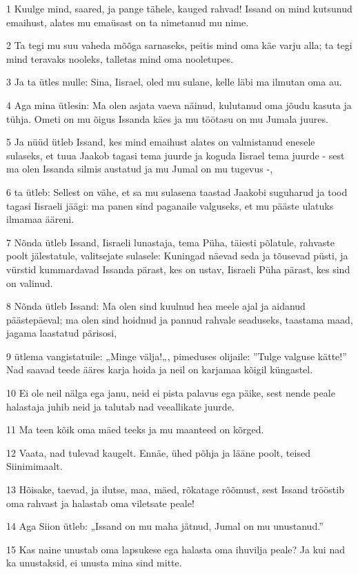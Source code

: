 \par 1 Kuulge mind, saared, ja pange tähele, kauged rahvad! Issand on mind kutsunud emaihust, alates mu emaüsast on ta nimetanud mu nime.
\par 2 Ta tegi mu suu vaheda mõõga sarnaseks, peitis mind oma käe varju alla; ta tegi mind teravaks nooleks, talletas mind oma nooletupes.
\par 3 Ja ta ütles mulle: Sina, Iisrael, oled mu sulane, kelle läbi ma ilmutan oma au.
\par 4 Aga mina ütlesin: Ma olen asjata vaeva näinud, kulutanud oma jõudu kasuta ja tühja. Ometi on mu õigus Issanda käes ja mu töötasu on mu Jumala juures.
\par 5 Ja nüüd ütleb Issand, kes mind emaihust alates on valmistanud enesele sulaseks, et tuua Jaakob tagasi tema juurde ja koguda Iisrael tema juurde - sest ma olen Issanda silmis austatud ja mu Jumal on mu tugevus -,
\par 6 ta ütleb: Sellest on vähe, et sa mu sulasena taastad Jaakobi suguharud ja tood tagasi Iisraeli jäägi: ma panen sind paganaile valguseks, et mu pääste ulatuks ilmamaa ääreni.
\par 7 Nõnda ütleb Issand, Iisraeli lunastaja, tema Püha, täiesti põlatule, rahvaste poolt jälestatule, valitsejate sulasele: Kuningad näevad seda ja tõusevad püsti, ja vürstid kummardavad Issanda pärast, kes on ustav, Iisraeli Püha pärast, kes sind on valinud.
\par 8 Nõnda ütleb Issand: Ma olen sind kuulnud hea meele ajal ja aidanud päästepäeval; ma olen sind hoidnud ja pannud rahvale seaduseks, taastama maad, jagama laastatud pärisosi,
\par 9 ütlema vangistatuile: „Minge välja!„, pimeduses olijaile: ”Tulge valguse kätte!” Nad saavad teede ääres karja hoida ja neil on karjamaa kõigil küngastel.
\par 10 Ei ole neil nälga ega janu, neid ei pista palavus ega päike, sest nende peale halastaja juhib neid ja talutab nad veeallikate juurde.
\par 11 Ma teen kõik oma mäed teeks ja mu maanteed on kõrged.
\par 12 Vaata, nad tulevad kaugelt. Ennäe, ühed põhja ja lääne poolt, teised Siinimimaalt.
\par 13 Hõisake, taevad, ja ilutse, maa, mäed, rõkatage rõõmust, sest Issand trööstib oma rahvast ja halastab oma viletsate peale!
\par 14 Aga Siion ütleb: „Issand on mu maha jätnud, Jumal on mu unustanud.”
\par 15 Kas naine unustab oma lapsukese ega halasta oma ihuvilja peale? Ja kui nad ka unustaksid, ei unusta mina sind mitte.
